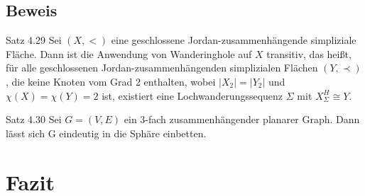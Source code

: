 \documentclass{beamer}
\begin{document}
\subsection{Beweis}
\begin{frame}
\begin{block}{Satz 4.29}
Sei $(X,<)$ eine geschlossene Jordan-zusammenhängende simpliziale Fläche. Dann ist die Anwendung von Wanderinghole auf $X$ transitiv, das heißt, für alle geschlossenen Jordan-zusammenhängenden simplizialen Flächen $(Y,\prec)$, die keine Knoten vom Grad 2 enthalten, wobei $\vert X_2 \vert = \vert Y_2 \vert$ und $\chi(X)=\chi(Y)=2$ ist, existiert eine Lochwanderungssequenz $\Sigma$ mit $X^H_{\Sigma} \cong Y$.
\end{block}
\end{frame}
\begin{frame}
\begin{block}{Satz 4.30}
Sei $G=(V,E)$ ein 3-fach zusammenhängender planarer Graph. Dann lässt sich G eindeutig in die Sphäre einbetten.
\end{block}
\end{frame}
\section{Fazit}

\end{document}
